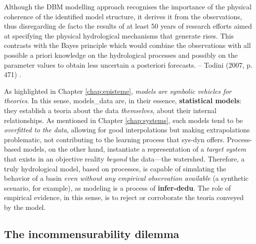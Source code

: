 \documentclass[./main_en.tex]{subfiles}
\begin{document}
\begin{adjustwidth}{100pt}{0pt}
\medskip
\small
Although the DBM modelling approach recognises the importance of the  physical coherence of the identified model structure, it derives it from the observations, thus disregarding de facto the results of at least 50 years of research efforts aimed at specifying the physical hydrological mechanisms that generate rises. This contrasts with the Bayes principle which would combine the observations with all possible a priori knowledge on the hydrological processes and possibly on the parameter values to obtain less uncertain a posteriori forecasts. -- Todini (2007, p. 471) \cite{Todini2007a}.
\medskip
\end{adjustwidth}
\noindent As highlighted in Chapter \ref{chap:episteme}, \textit{models are symbolic vehicles for theories}. In this sense, \gls{models_data} are, in their essence, \textbf{statistical models}: they establish a \gls{teoria} about the data \textit{themselves}, about their internal relationships. As mentioned in Chapter \ref{chap:systems}, such models tend to be \textit{overfitted to the data}, allowing for good interpolations but making extrapolations problematic, not contributing to the learning process that \gls{sys-dyn} offers. Process-based models, on the other hand, instantiate a representation of a \textit{target system} that exists in an objective reality \textit{beyond} the data—the watershed. Therefore, a truly hydrological \gls{model}, based on processes, is capable of simulating the behavior of a basin \textit{even without any empirical observation available} (a synthetic scenario, for example), as modeling is a process of \textbf{\gls{infer-dedu}}. The role of empirical evidence, in this sense, is to reject or corroborate the \gls{teoria} conveyed by the \gls{model}.

\subsection{The incommensurability dilemma} \label{sec:hydro:incomm}
\end{document}
